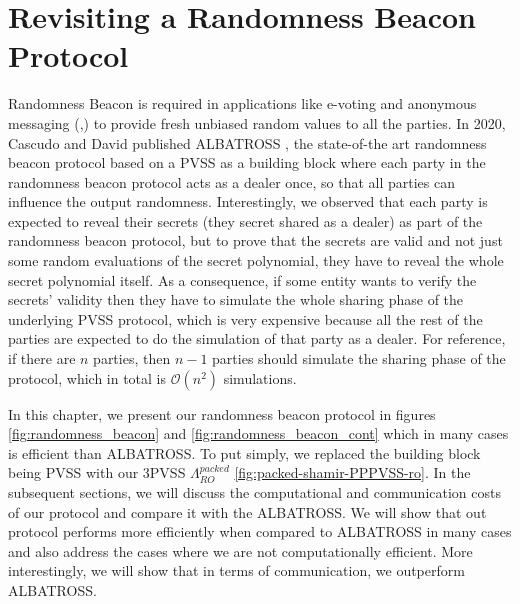 \chapter{Revisiting a Randomness Beacon Protocol}
\label{cha:n}

Randomness Beacon \cite{RABIN1983256} is required in applications like e-voting \cite{10.5555/1496711.1496734} 
and anonymous messaging (\cite{180263},\cite{10.1145/2815400.2815417}) to provide fresh unbiased random values to all the 
parties. In 2020, Cascudo and David published ALBATROSS \cite{cryptoeprint:2020/644}, the state-of-the art randomness 
beacon protocol based on a PVSS as a building block where each party in the randomness beacon protocol acts as a dealer once, so that all 
parties can influence the output randomness. Interestingly, we observed that each party is expected to reveal 
their secrets (they secret shared as a dealer) as part of the randomness beacon protocol, but to prove that the 
secrets are valid and not just some random evaluations of the secret polynomial, they have to reveal the whole 
secret polynomial itself. As a consequence, if some entity wants to verify the secrets' validity then they have to 
simulate the whole sharing phase of the underlying PVSS protocol, which is very expensive because all the rest of the 
parties are expected to do the simulation of that party as a dealer. For reference, if there are $n$ parties, then 
$n-1$ parties should simulate the sharing phase of the protocol, which in total is $\mathcal{O}(n^2)$ simulations.\par

In this chapter, we present our randomness beacon protocol in figures \ref{fig:randomness_beacon} and \ref{fig:randomness_beacon_cont} 
which in many cases is efficient than ALBATROSS. To put simply, we replaced the building block being PVSS with 
our 3PVSS $\Lambda_{RO}^{packed}$ \ref{fig:packed-shamir-PPPVSS-ro}. In the subsequent sections, we will discuss the 
computational and communication costs of our protocol and compare it with the ALBATROSS. We will show that out protocol 
performs more efficiently when compared to ALBATROSS in many cases and also address the cases where we are not computationally efficient.
More interestingly, we will show that in terms of communication, we outperform ALBATROSS.



